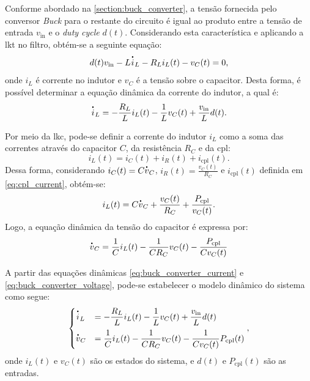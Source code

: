 Conforme abordado na \autoref{section:buck_converter}, a tensão fornecida pelo conversor \textit{Buck} para o restante do circuito é igual ao produto entre a tensão de entrada $v_{\mathrm{in}}$ e o \textit{duty cycle }$d(t)$. Considerando esta característica e aplicando a \acrfull{lkt} no filtro, obtém-se a seguinte equação: \begin{equation} d(t)v_{\mathrm{in}} - L \dt{i}_L - R_L i_L(t) - v_C(t) = 0, \end{equation} onde $i_L$ é corrente no indutor e $v_C$ é a tensão sobre o capacitor. Desta forma, é possível determinar a equação dinâmica da corrente do indutor, a qual é: \begin{equation} \dt{i}_L = - \frac{R_L}{L} i_L(t) - \frac{1}{L} v_C(t) + \frac{v_{\mathrm{in}}}{L}d(t). \label{eq:buck_converter_current} \end{equation}

Por meio da \acrfull{lkc}, pode-se definir a corrente do indutor $i_{L}$ como a soma das correntes através do capacitor $C$, da resistência $R_C$ e da \acrshort{cpl}: \begin{equation} i_L(t) = i_C(t) + i_R(t) + i_{\mathrm{cpl}}(t). \end{equation} Dessa forma, considerando $i_C(t) = C\dt{v}_C$, $i_R(t) = \frac{v_C(t)}{R_C}$ e $i_{\mathrm{cpl}}(t)$ definida em \eqref{eq:cpl_current}, obtém-se: \begin{equation} i_L(t) = C\dt{v}_C + \frac{v_C(t)}{R_C} + \frac{P_{\mathrm{cpl}}}{v_C(t)}. \end{equation} Logo, a equação dinâmica da tensão do capacitor é expressa por: \begin{equation} \dt{v}_C = \frac{1}{C} i_L(t) - \frac{1}{CR_C}v_C(t) - \frac{P_{\mathrm{cpl}}}{Cv_C(t)} \label{eq:buck_converter_voltage} \end{equation}

A partir das equações dinâmicas \eqref{eq:buck_converter_current} e \eqref{eq:buck_converter_voltage}, pode-se estabelecer o modelo dinâmico do sistema como segue: \begin{equation}\begin{cases} \dt{i}_L &= \displaystyle - \frac{R_L}{L} i_L(t) - \frac{1}{L} v_C(t) + \frac{v_{\mathrm{in}}}{L}d(t)  \\[8pt] \dt{v}_C &= \displaystyle \frac{1}{C} i_L(t) - \frac{1}{C R_C} v_C(t) - \frac{1}{C v_C(t)} P_{\mathrm{cpl}}(t) \label{eq:buck_nonlinear_system} \end{cases}, \end{equation} onde $i_L(t)$ e $v_C(t)$ são os estados do sistema, e $d(t)$ e $P_{\mathrm{cpl}}(t)$ são as entradas.

